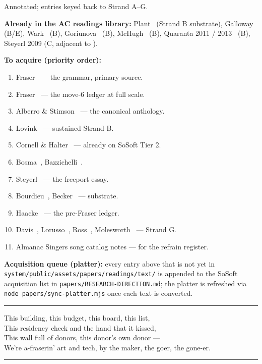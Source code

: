 \documentclass[10pt,letterpaper,twocolumn]{article}
\newenvironment{refrain}{%
  \par\vspace{0.4em}\noindent\rule{\columnwidth}{0.4pt}\par\vspace{0.2em}%
  \begin{flushleft}\itshape\small\color{acdark}%
}{%
  \end{flushleft}\vspace{0.1em}\noindent\rule{\columnwidth}{0.4pt}\par\vspace{0.4em}%
}
\begin{document}
Annotated; entries keyed back to Strand A--G.

\textbf{Already in the AC readings library:} Plant~\citep{plant1997zeros} (Strand B substrate), Galloway~\citep{galloway2004protocol} (B/E), Wark~\citep{wark2004hacker} (B), Goriunova~\citep{goriunova2006readme} (B), McHugh~\citep{mchugh2019post} (B), Quaranta 2011 / 2013~\citep{quaranta2011computer,quaranta2013beyond} (B), Steyerl 2009 (C, adjacent to \citealp{steyerl2017duty}).

\textbf{To acquire (priority order):}
\begin{enumerate}[leftmargin=1.2em,itemsep=0.1em]
\item Fraser~\citep{fraser2005critique} --- the grammar, primary source.
\item Fraser~\citep{fraser2018museums} --- the move-6 ledger at full scale.
\item Alberro \& Stimson~\citep{alberro2009institutional} --- the canonical anthology.
\item Lovink~\citep{lovink2011networks,lovink2016social} --- sustained Strand B.
\item Cornell \& Halter~\citep{cornell2015mass} --- already on SoSoft Tier 2.
\item Bosma~\citep{bosma2011nettitudes}, Bazzichelli~\citep{bazzichelli2013networked}.
\item Steyerl~\citep{steyerl2017duty} --- the freeport essay.
\item Bourdieu~\citep{bourdieu1996rules}, Becker~\citep{becker1982art} --- substrate.
\item Haacke~\citep{haacke1971shapolsky} --- the pre-Fraser ledger.
\item Davis~\citep{davis2013theses}, Lorusso~\citep{lorusso2019entreprecariat}, Ross~\citep{ross2009nice,ross2003nocollar}, Molesworth~\citep{molesworth2003work} --- Strand G.
\item Almanac Singers song catalog notes --- for the refrain register.
\end{enumerate}

\textbf{Acquisition queue (platter):} every entry above that is not yet in \texttt{system/public/assets/papers/readings/text/} is appended to the SoSoft acquisition list in \texttt{papers/RESEARCH-DIRECTION.md}; the platter is refreshed via \texttt{node papers/sync-platter.mjs} once each text is converted.

\begin{refrain}
\noindent
This building, this budget, this board, this list, \\
This residency check and the hand that it kissed, \\
This wall full of donors, this donor's own donor --- \\
We're a-fraserin' art and tech, by the maker, the goer, the gone-er.
\end{refrain}



\end{document}
